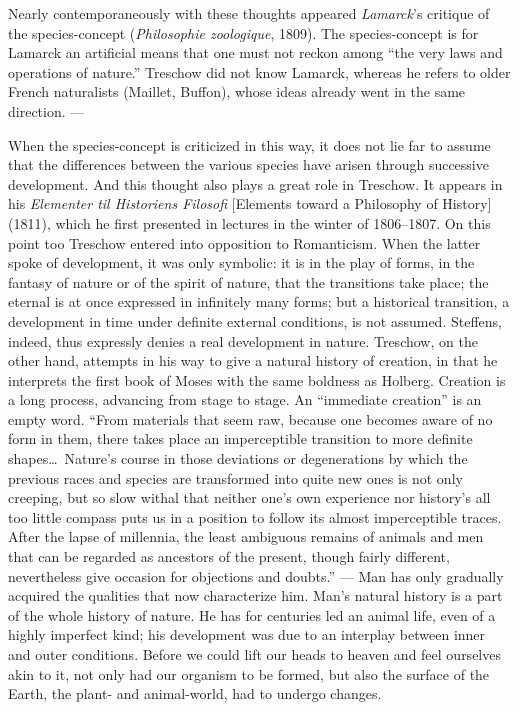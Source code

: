 \documentclass[12pt,a4paper]{book}
\newcommand{\opage}[1]{\marginnote{\footnotesize\textit{[#1]}}}
\begin{document}
Nearly contemporaneously with these thoughts appeared \emph{Lamarck}'s critique of the
species-concept (\emph{Philosophie zoologique}, 1809). The species-concept is for
Lamarck an artificial means that one must not reckon among ``the very laws and
operations of nature.'' Treschow did not know Lamarck, whereas he refers to older French
naturalists (Maillet, Buffon), whose ideas already went in the same direction. ---

When the species-concept is criticized in this way, it does not lie far to assume that
the differences between the various species have arisen through successive development.
And this thought also plays a great role in Treschow. It appears in his \emph{Elementer
til Historiens Filosofi} [Elements toward a Philosophy of History] (1811), which he first
presented in lectures in the winter of 1806--1807. On this point too Treschow entered
into opposition to Romanticism. When the latter spoke of development, it was only
symbolic: \opage{93}it is in the play of forms, in the fantasy of nature or of the spirit of
nature, that the transitions take place; the eternal is at once expressed in infinitely
many forms; but a historical transition, a development in time under definite external
conditions, is not assumed. Steffens, indeed, thus expressly denies a real development
in nature. Treschow, on the other hand, attempts in his way to give a natural history of
creation, in that he interprets the first book of Moses with the same boldness as
Holberg. Creation is a long process, advancing from stage to stage. An ``immediate
creation'' is an empty word. ``From materials that seem raw, because one becomes aware
of no form in them, there takes place an imperceptible transition to more definite
shapes\ldots\ Nature's course in those deviations or degenerations by which the previous
races and species are transformed into quite new ones is not only creeping, but so slow
withal that neither one's own experience nor history's all too little compass puts us in
a position to follow its almost imperceptible traces. After the lapse of millennia, the
least ambiguous remains of animals and men that can be regarded as ancestors of the
present, though fairly different, nevertheless give occasion for objections and doubts.''
--- Man has only gradually acquired the qualities that now characterize him. Man's
natural history is a part of the whole history of nature. He has for centuries led an
animal life, even of a highly imperfect kind; his development was due to an interplay
between inner and outer conditions. Before we could lift our heads to heaven and feel
ourselves akin to it, not only had our organism to be formed, but also the surface of
the Earth, the plant- and animal-world, had to undergo changes.
\end{document}
